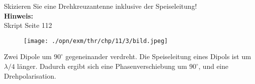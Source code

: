 \begin{question}[section=11,name={Drehkreuzantenne 2},difficulty=,quantity=6,type=thr,tags={20130314,20060816}]
	Skizieren Sie eine Drehkreuzantenne inklusive der Speiseleitung!
	\\ \textbf{Hinweis:}\\
	Skript Seite 112
\end{question}
\begin{solution}
	\begin{figure}[H]
		\texttt{[image: ./opn/exm/thr/chp/11/3/bild.jpeg]}
	\end{figure}
	Zwei Dipole um $90^\circ$ gegeneinander verdreht. Die Speiseleitung eines Dipols ist um $\lambda/4$ länger. Dadurch ergibt sich eine Phasenverschiebung um $90^\circ$, und eine Drehpolarisation.
\end{solution}
